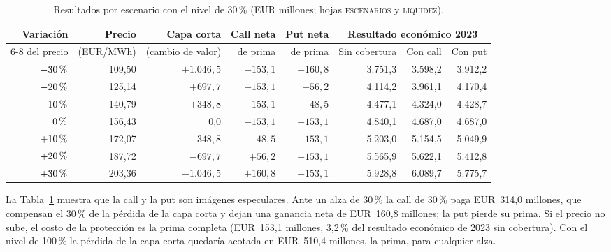 \documentclass[11pt,letterpaper]{article}
\theoremstyle{plain}
\theoremstyle{definition}
\theoremstyle{remark}
\numberwithin{equation}{section}
\newcommand{\pc}{\mbox{\,\%}}
\begin{document}
\begin{table}[H]
    \centering\small
    \caption{Resultados por escenario con el nivel de 30\pc{} (EUR millones; hojas \textsc{escenarios} y \textsc{liquidez}).}\label{tab:esc}
    \begin{tabular}{@{}rrrrrrrr@{}}
    \toprule
        Variación & Precio & Capa corta & Call neta & Put neta & \multicolumn{3}{c}{Resultado económico 2023}\\
    \cmidrule(l){6-8}
        del precio & (EUR/MWh) & (cambio de valor) & de prima & de prima & Sin cobertura & Con call & Con put\\
    \midrule
        $-30\pc{}$ & 109,50 & $+1.046{,}5$ & $-153{,}1$ & $+160{,}8$ & 3.751,3 & 3.598,2 & 3.912,2\\
        $-20\pc{}$ & 125,14 & $+697{,}7$ & $-153{,}1$ & $+56{,}2$ & 4.114,2 & 3.961,1 & 4.170,4\\
        $-10\pc{}$ & 140,79 & $+348{,}8$ & $-153{,}1$ & $-48{,}5$ & 4.477,1 & 4.324,0 & 4.428,7\\
        $0\pc{}$ & 156,43 & 0,0 & $-153{,}1$ & $-153{,}1$ & 4.840,1 & 4.687,0 & 4.687,0\\
        $+10\pc{}$ & 172,07 & $-348{,}8$ & $-48{,}5$ & $-153{,}1$ & 5.203,0 & 5.154,5 & 5.049,9\\
        $+20\pc{}$ & 187,72 & $-697{,}7$ & $+56{,}2$ & $-153{,}1$ & 5.565,9 & 5.622,1 & 5.412,8\\
        $+30\pc{}$ & 203,36 & $-1.046{,}5$ & $+160{,}8$ & $-153{,}1$ & 5.928,8 & 6.089,7 & 5.775,7\\
    \bottomrule
    \end{tabular}
\end{table}

La Tabla~\ref{tab:esc} muestra que la call y la put son imágenes especulares. Ante un alza de 30\pc{} la call de 30\pc{} paga EUR~314,0 millones, que compensan el 30\pc{} de la pérdida de la capa corta y dejan una ganancia neta de EUR~160,8 millones; la put pierde su prima. Si el precio no sube, el costo de la protección es la prima completa (EUR~153,1 millones, 3,2\pc{} del resultado económico de 2023 sin cobertura). Con el nivel de 100\pc{} la pérdida de la capa corta quedaría acotada en EUR~510,4 millones, la prima, para cualquier alza.
\end{document}
